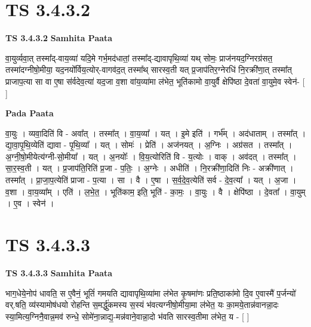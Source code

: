 \documentclass[17pt]{extarticle}
\begin{document}

\section{ TS 3.4.3.2 }

\textbf{TS 3.4.3.2 } \newline
\textbf{Samhita Paata} \newline

वा॒युर्व्यवा॒त् तस्मा᳚द्-वाय॒व्या॑ यदि॒मे गर्भ॒मद॑धातां॒ तस्मा᳚द्-द्यावापृथि॒व्या॑ यथ् सोमः॒ प्राज॑नयद॒ग्निरग्र॑सत॒ तस्मा॑दग्नीषो॒मीया॒ यद॒नयो᳚र्विय॒त्योर्-वागव॑द॒त् तस्मा᳚थ् सारस्व॒ती यत् प्र॒जाप॑तिर॒ग्नेरधि॑ नि॒रक्री॑णा॒त् तस्मा᳚त् प्राजाप॒त्या सा वा ए॒षा स॑र्वदेव॒त्या॑ यद॒जा व॒शा वा॑य॒व्या॑मा ल॑भेत॒ भूति॑कामो वा॒युर्वै क्षेपि॑ष्ठा दे॒वता॑ वा॒युमे॒व स्वेन॑- [  ] \newline

\textbf{Pada Paata} \newline

वा॒युः । व्यवा॒दिति॑ वि - अवा᳚त् । तस्मा᳚त् । वा॒य॒व्या᳚ । यत् । इ॒मे इति॑ । गर्भ᳚म् । अद॑धाताम् । तस्मा᳚त् । द्या॒वा॒पृ॒थि॒व्येति॑ द्यावा - पृ॒थि॒व्या᳚ । यत् । सोमः॑ । प्रेति॑ । अज॑नयत् । अ॒ग्निः । अग्र॑सत । तस्मा᳚त् । अ॒ग्नी॒षो॒मीयेत्य॑ग्नी-सो॒मीया᳚ । यत् । अ॒नयोः᳚ । वि॒य॒त्योरिति॑ वि - य॒त्योः । वाक् । अव॑दत् । तस्मा᳚त् । सा॒र॒स्व॒ती । यत् । प्र॒जाप॑ति॒रिति॑ प्र॒जा - प॒तिः॒ । अ॒ग्नेः । अधीति॑ । नि॒रक्री॑णा॒दिति॑ निः - अक्री॑णात् । तस्मा᳚त् । प्रा॒जा॒प॒त्येति॑ प्राजा - प॒त्या । सा । वै । ए॒षा । स॒र्व॒दे॒व॒त्येति॑ सर्व - दे॒व॒त्या᳚ । यत् । अ॒जा । व॒शा । वा॒य॒व्या᳚म् । एति॑ । ल॒भे॒त॒ । भूति॑काम॒ इति॒ भूति॑ - का॒मः॒ । वा॒युः । वै । क्षेपि॑ष्ठा । दे॒वता᳚ । वा॒युम् । ए॒व । स्वेन॑ ।  \newline





\section{ TS 3.4.3.3 }

\textbf{TS 3.4.3.3 } \newline
\textbf{Samhita Paata} \newline

भाग॒धेये॒नोप॑ धावति॒ स ए॒वैनं॒ भूतिं॑ गमयति द्यावापृथि॒व्या॑मा ल॑भेत कृ॒षमा॑णः प्रति॒ष्ठाका॑मो दि॒व ए॒वास्मै॑ प॒र्जन्यो॑ वर्.षति॒ व्य॑स्यामोष॑धयो रोहन्ति स॒मर्द्धु॑कमस्य स॒स्यं भ॑वत्यग्नीषो॒मीया॒मा ल॑भेत॒ यः का॒मये॒तान्न॑वानन्ना॒दः स्या॒मित्य॒ग्निनै॒वान्न॒मव॑ रुन्धे॒ सोमे॑ना॒न्नाद्य॒-मन्न॑वाने॒वान्ना॒दो भ॑वति सारस्व॒तीमा ल॑भेत॒ य - [  ] \newline
\end{document}
